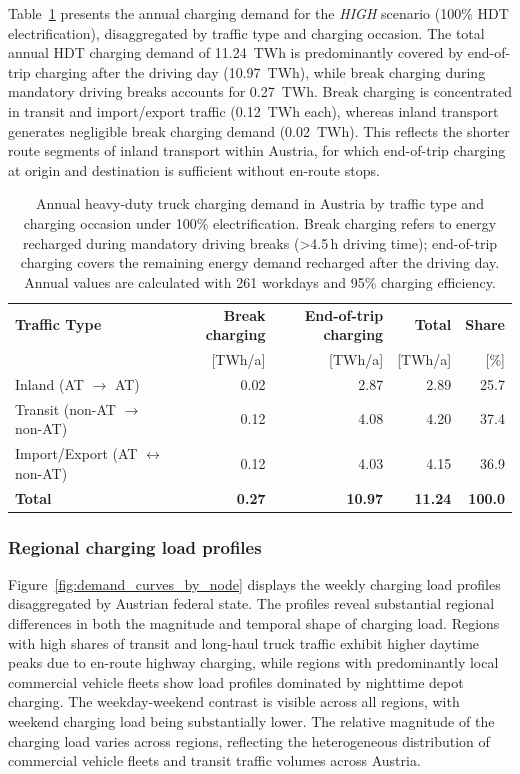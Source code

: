 Table~\ref{tab:snf_yearly_demand} presents the annual charging demand for the \textit{HIGH} scenario (100\% \ac{HDT} electrification), disaggregated by traffic type and charging occasion. The total annual \ac{HDT} charging demand of 11.24~TWh is predominantly covered by end-of-trip charging after the driving day (10.97~TWh), while break charging during mandatory driving breaks accounts for 0.27~TWh. Break charging is concentrated in transit and import/export traffic (0.12~TWh each), whereas inland transport generates negligible break charging demand (0.02~TWh). This reflects the shorter route segments of inland transport within Austria, for which end-of-trip charging at origin and destination is sufficient without en-route stops.

\begin{table}[htbp]
  \centering
  \caption{Annual heavy-duty truck charging demand in Austria by traffic type and charging occasion under 100\% electrification. Break charging refers to energy recharged during mandatory driving breaks ({>}4.5\,h driving time); end-of-trip charging covers the remaining energy demand recharged after the driving day.
  Annual values are calculated with 261 workdays and 95\% charging efficiency.}
  \label{tab:snf_yearly_demand}
  \begin{tabular}{lrrrr}
  \toprule
  \textbf{Traffic Type} & \textbf{Break charging} & \textbf{End-of-trip charging} & \textbf{Total} & \textbf{Share} \\
   & [TWh/a] & [TWh/a] & [TWh/a] & [\%] \\
  \midrule
  Inland (AT $\rightarrow$ AT) & 0.02 & 2.87 & 2.89 & 25.7 \\
  Transit (non-AT $\rightarrow$ non-AT) & 0.12 & 4.08 & 4.20 & 37.4 \\
  Import/Export (AT $\leftrightarrow$ non-AT) & 0.12 & 4.03 & 4.15 & 36.9 \\
  \midrule
  \textbf{Total} & \textbf{0.27} & \textbf{10.97} & \textbf{11.24} & \textbf{100.0} \\
  \bottomrule
  \end{tabular}
  \end{table}

\subsubsection{Regional charging load profiles}

Figure~\ref{fig:demand_curves_by_node} displays the weekly charging load profiles disaggregated by Austrian federal state. The profiles reveal substantial regional differences in both the magnitude and temporal shape of charging load. Regions with high shares of transit and long-haul truck traffic exhibit higher daytime peaks due to en-route highway charging, while regions with predominantly local commercial vehicle fleets show load profiles dominated by nighttime depot charging. The weekday-weekend contrast is visible across all regions, with weekend charging load being substantially lower. The relative magnitude of the charging load varies across regions, reflecting the heterogeneous distribution of commercial vehicle fleets and transit traffic volumes across Austria.

